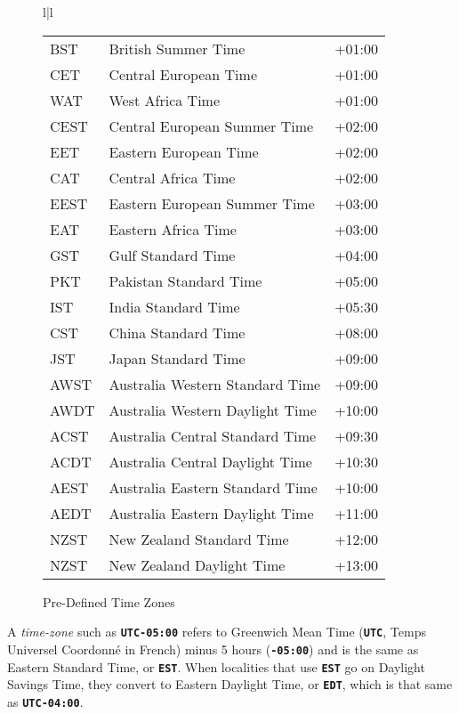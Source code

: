 \documentclass[12pt]{article}
\newcommand{\TT}[1]{{\tt \bfseries #1}}
\newlength{\figurewidth}
\newenvironment{boxedfigure}[1][!btp]%
	{\begin{figure*}[#1]
	 \begin{lrbox}{\figurebox}
	 \begin{minipage}{\figurewidth}

	 \vspace*{1ex}}%
	{
	 \vspace*{1ex}

	 \end{minipage}
	 \end{lrbox}
	 \begin{center}
	 \fbox{\hspace*{0.1in}\usebox{\figurebox}\hspace*{0.1in}}
	 \end{center}
	 \end{figure*}}
\begin{document}
\begin{boxedfigure}[t]
\begin{center}
\begin{tabular}{l|l}
\begin{tabular}{@{}lll@{}}
BST   & British Summer Time           & +01:00 \\
CET   & Central European Time         & +01:00 \\
WAT   & West Africa Time              & +01:00 \\
CEST  & Central European Summer Time  & +02:00 \\
EET   & Eastern European Time         & +02:00 \\
CAT   & Central Africa Time           & +02:00 \\
EEST  & Eastern European Summer Time  & +03:00 \\
EAT   & Eastern Africa Time           & +03:00 \\
GST   & Gulf Standard Time            & +04:00 \\
PKT   & Pakistan Standard Time        & +05:00 \\
IST   & India Standard Time           & +05:30 \\
CST   & China Standard Time           & +08:00 \\
JST   & Japan Standard Time           & +09:00 \\
AWST  & Australia Western Standard Time        & +09:00 \\
AWDT  & Australia Western Daylight Time        & +10:00 \\
ACST  & Australia Central Standard Time        & +09:30 \\
ACDT  & Australia Central Daylight Time        & +10:30 \\
AEST  & Australia Eastern Standard Time        & +10:00 \\
AEDT  & Australia Eastern Daylight Time        & +11:00 \\
NZST  & New Zealand Standard Time     & +12:00 \\
NZST  & New Zealand Daylight Time     & +13:00 \\
\end{tabular}
\end{tabular}
\end{center}
\vspace*{-3ex}
\caption{Pre-Defined Time Zones}
\label{PRE-DEFINED-TIME-ZONES}
\end{boxedfigure}

A {\em time-zone} such as \TT{UTC-05:00} refers to Greenwich Mean Time
(\TT{UTC}, Temps Universel Coordonn\'e in French)
minus 5 hours (\TT{-05:00}) and is the same as
Eastern Standard Time, or \TT{EST}.   When localities that use \TT{EST}
go on Daylight Savings Time, they convert to Eastern Daylight Time, or
\TT{EDT}, which is that same as \TT{UTC-04:00}.
\end{document}
